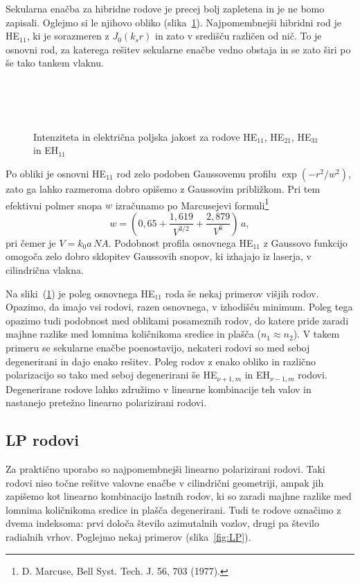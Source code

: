 Sekularna enačba za hibridne rodove je precej bolj zapletena in je ne bomo zapisali. 
Oglejmo si le njihovo obliko (slika~\ref{fig:HE11}). Najpomembnejši hibridni rod je HE$_{11}$, 
ki je sorazmeren z $J_0(k_sr)$ in zato v središču različen od nič. 
To je osnovni rod, za katerega rešitev sekularne enačbe vedno obstaja in se
zato širi po še tako tankem vlaknu. 
\begin{figure}[h]
\centering
\def\svgwidth{85truemm} 
\\
\def\svgwidth{85truemm} 
 \\
\def\svgwidth{85truemm} 
 \\
\def\svgwidth{85truemm} 

\caption{Intenziteta in električna poljska jakost za rodove
HE$_{11}$, HE$_{21}$, HE$_{31}$ in EH$_{11}$}
\label{fig:HE11}
\end{figure}

Po obliki je osnovni HE$_{11}$ rod zelo podoben Gaussovemu profilu $\exp(-r^2/w^2)$,
zato ga lahko razmeroma dobro opišemo z Gaussovim približkom. 
Pri tem efektivni polmer snopa
$w$ izračunamo po Marcusejevi
 formuli\footnote{D. Marcuse, Bell Syst. Tech. J. 56, 703 (1977).}
\begin{equation} 
w = (0,65 + \frac{1,619}{V^{3/2}}+\frac{2,879}{V^{6}})\,a,
\label{Marcuse}
\end{equation}
pri čemer je $V = k_0 a\,NA $. Podobnost profila osnovnega
HE$_{11}$ z Gaussovo funkcijo omogoča zelo dobro sklopitev Gaussovih
snopov, ki izhajajo iz laserja, v cilindrična vlakna.

Na sliki~(\ref{fig:HE11}) je poleg osnovnega HE$_{11}$ roda še nekaj primerov višjih rodov. Opazimo, 
da imajo vsi rodovi, razen osnovnega, v izhodišču minimum. Poleg tega opazimo tudi podobnost med 
oblikami posameznih rodov, do katere pride zaradi majhne razlike med lomnima količnikoma sredice in plašča
($n_1 \approx n_2$). V takem primeru se sekularne enačbe poenostavijo, nekateri rodovi so 
med seboj degenerirani in dajo enako rešitev. Poleg rodov z enako obliko in različno polarizacijo so tako 
med seboj degenerirani še HE$_{\nu+1,m}$ in EH$_{\nu-1,m}$ rodovi. Degenerirane 
rodove lahko združimo v linearne kombinacije teh valov in nastanejo pretežno linearno polarizirani 
rodovi. 

\subsection*{LP rodovi}
Za praktično uporabo so najpomembnejši linearno polarizirani rodovi. Taki rodovi niso
točne rešitve valovne enačbe v cilindrični geometriji, ampak jih zapišemo kot linearno 
kombinacijo lastnih rodov, ki so zaradi majhne razlike med lomnima količnikoma sredice
in plašča degenerirani. Tudi te rodove označimo z dvema indeksoma: prvi določa število azimutalnih
vozlov, drugi pa število radialnih vrhov. Poglejmo nekaj primerov (slika~\ref{fig:LP}).

